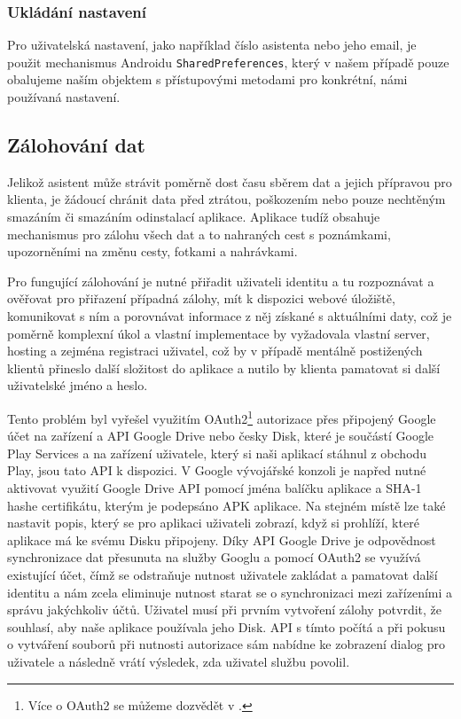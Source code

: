 \documentclass{article}
\begin{document}
\subsubsection{Ukládání nastavení}
Pro uživatelská nastavení, jako například číslo asistenta nebo jeho email, je použit mechanismus Androidu
\texttt{SharedPreferences}, který v našem případě pouze obalujeme naším objektem s přístupovými
metodami pro konkrétní, námi používaná nastavení.


\subsection{Zálohování dat}
Jelikož asistent může strávit poměrně dost času sběrem dat a jejich přípravou pro klienta, je žádoucí chránit data před ztrátou,
poškozením nebo pouze nechtěným smazáním či smazáním odinstalací aplikace. Aplikace tudíž obsahuje mechanismus pro zálohu všech
dat a to nahraných cest s poznámkami, upozorněními na změnu cesty, fotkami a nahrávkami.

Pro fungující zálohování je nutné přiřadit uživateli identitu a tu rozpoznávat a ověřovat pro přiřazení případná zálohy,
mít k dispozici webové úložiště, komunikovat s ním a porovnávat informace z něj získané s aktuálními daty,
což je poměrně komplexní úkol a vlastní implementace by
vyžadovala vlastní server, hosting a zejména registraci uživatel, což by v případě mentálně postižených klientů
přineslo další složitost do aplikace a nutilo by klienta pamatovat si další uživatelské jméno a heslo.

Tento problém byl vyřešel využitím OAuth2\footnote{Více o OAuth2 se můžeme dozvědět v \cite{oauth2}.}
autorizace přes připojený Google účet na zařízení a API Google Drive nebo česky Disk,
 které je součástí Google Play Services a na zařízení uživatele, který si naši aplikací stáhnul z obchodu Play,
 jsou tato API k dispozici.
V Google vývojářské konzoli je napřed nutné aktivovat využití Google Drive API pomocí jména balíčku aplikace a SHA-1 hashe
certifikátu, kterým je podepsáno APK aplikace. Na stejném místě lze také nastavit popis, který se pro aplikaci
uživateli zobrazí, když si prohlíží, které aplikace má ke svému Disku připojeny.
Díky API Google Drive je odpovědnost synchronizace dat přesunuta na služby Googlu a pomocí
OAuth2 se využívá existující účet, čímž se odstraňuje nutnost uživatele zakládat a pamatovat
 další identitu a nám zcela eliminuje nutnost starat se o synchronizaci mezi zařízeními a správu jakýchkoliv účtů.
 Uživatel musí při prvním vytvoření zálohy potvrdit, že souhlasí, aby naše aplikace používala jeho Disk.
 API s tímto počítá a při pokusu o vytváření souborů při nutnosti autorizace sám nabídne ke zobrazení
 dialog pro uživatele a následně vrátí výsledek, zda uživatel službu povolil.
\end{document}
